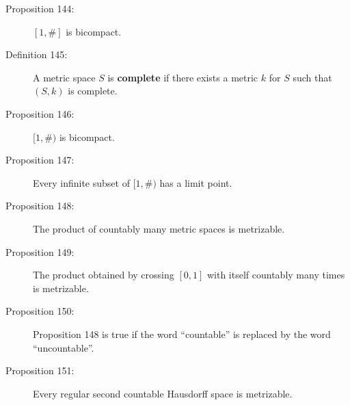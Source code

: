 \documentclass{article}
\begin{document}
\begin{description}
  \item[Proposition 144:] $[1,\#]$ is bicompact.

  \item[Definition 145:] A metric space $S$ is {\bf complete} if there exists a metric $k$ for $S$ such that $(S,k)$ is complete.

  \item[Proposition 146:] $[1,\#)$ is bicompact.

  \item[Proposition 147:] Every infinite subset of $[1,\#)$ has a limit point.

  \item[Proposition 148:] The product of countably many metric spaces is metrizable.

  \item[Proposition 149:] The product obtained by crossing $[0,1]$ with itself countably many times is metrizable.

  \item[Proposition 150:] Proposition 148 is true if the word ``countable'' is replaced by the word ``uncountable''.

  \item[Proposition 151:] Every regular second countable Hausdorff space is metrizable.

\end{description}
\end{document}
